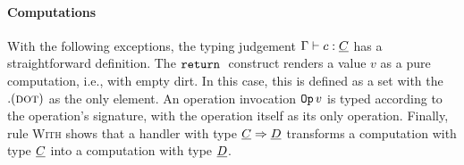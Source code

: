 \documentclass[sigplan,10pt]{acmart}\settopmatter{printfolios=true}
\begin{document}
\paragraph{Computations}

With the following exceptions, the typing judgement \(\Gamma \vdash c : \underline{C}\)
has a straightforward definition. The \(\mathtt{return}\;\) construct renders a value
\(v\) as a pure computation, i.e., with empty dirt. In this case, this
is defined as a set with the \(. (\textsc{dot})\) as the only element. An
operation invocation \(\mathtt{Op}\,v\) is typed according to the operation's
signature, with the operation itself as its only operation. Finally,
rule \textsc{With} shows that a handler with type \(\underline{C} \Rightarrow \underline{D}\)
transforms a computation with type \(\underline{C}\) into a computation with type
\(\underline{D}\).

\begin{figure}[h]
\begin{center}
\end{center}
\end{figure}
\end{document}
